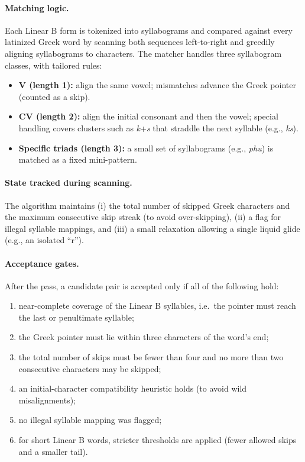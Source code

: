 \paragraph{Matching logic.}
Each Linear B form is tokenized into syllabograms and compared against every latinized Greek word by
scanning both sequences left-to-right and greedily aligning syllabograms to characters.
The matcher handles three syllabogram classes, with tailored rules:
\begin{itemize}[leftmargin=2em]
  \item \textbf{V (length 1):} align the same vowel; mismatches advance the Greek pointer (counted as a skip).
  \item \textbf{CV (length 2):} align the initial consonant and then the vowel; special handling covers clusters
        such as \textit{k}+\textit{s} that straddle the next syllable (e.g., \textit{ks}).
  \item \textbf{Specific triads (length 3):} a small set of syllabograms (e.g., \textit{phu}) is matched as a fixed mini-pattern.
\end{itemize}

\paragraph{State tracked during scanning.}
The algorithm maintains (i) the total number of skipped Greek characters and the maximum consecutive
skip streak (to avoid over-skipping), (ii) a flag for illegal syllable mappings, and (iii) a small
relaxation allowing a single liquid glide (e.g., an isolated ``r'').

\paragraph{Acceptance gates.}
After the pass, a candidate pair is accepted only if all of the following hold:
\begin{enumerate}[label=(\roman*), leftmargin=2em]
  \item near-complete coverage of the Linear B syllables, i.e.\ the pointer must reach the last or penultimate syllable;
  \item the Greek pointer must lie within three characters of the word's end;
  \item the total number of skips must be fewer than four and no more than two consecutive characters may be skipped;
  \item an initial-character compatibility heuristic holds (to avoid wild misalignments);
  \item no illegal syllable mapping was flagged;
  \item for short Linear B words, stricter thresholds are applied (fewer allowed skips and a smaller tail).
\end{enumerate}


